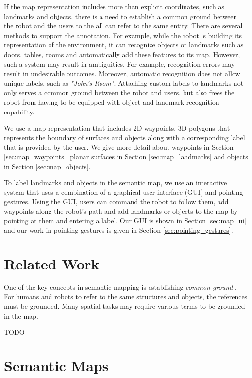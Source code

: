 \documentclass[12pt]{gatech-thesis}
\begin{document}
If the map representation includes more than explicit coordinates, such as landmarks and objects, there is a need to establish a common ground between the robot and the users to the all can refer to the same entity. There are several methods to support the annotation. For example, while the robot is building its representation of the environment, it can recognize objects or landmarks such as doors, tables, rooms and automatically add these features to its map. However, such a system may result in ambiguities. For example, recognition errors may result in undesirable outcomes. Moreover, automatic recognition does not allow unique labels, such as \textit{"John's Room"}. Attaching custom labels to landmarks not only serves a common ground between the robot and users, but also frees the robot from having to be equipped with object and landmark recognition capability.

We use a map representation that includes 2D waypoints, 3D polygons that represents the boundary of surfaces and objects along with a corresponding label that is provided by the user. We give more detail about waypoints in Section \ref{sec:map_waypoints}, planar surfaces in Section \ref{sec:map_landmarks} and objects in Section \ref{sec:map_objects}.

To label landmarks and objects in the semantic map, we use an interactive system that uses a combination of a graphical user interface (GUI) and pointing gestures. Using the GUI, users can command the robot to follow them, add waypoints along the robot's path and add landmarks or objects to the map by pointing at them and entering a label. Our GUI is shown in Section \ref{sec:map_ui} and our work in pointing gestures is given in Section \ref{sec:pointing_gestures}.

\section{Related Work}
\label{sec:map_relevant_work}

One of the key concepts in semantic mapping is establishing \textit{common ground} \cite{clark1991grounding}. For humans and robots to refer to the same structures and objects, the references must be grounded. Many spatial tasks may require various terms to be grounded in the map.

TODO


\section{Semantic Maps}
\label{sec:map_semantic_maps}
\end{document}
